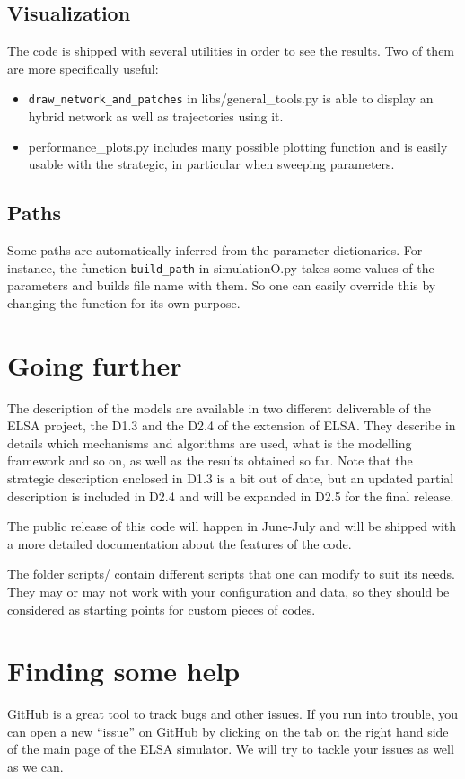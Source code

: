 \documentclass[12pt]{article}
\begin{document}
\subsection{Visualization}

The code is shipped with several utilities in order to see the results. Two of them are more specifically useful:
\begin{itemize}
\item \verb|draw_network_and_patches| in libs/general\_tools.py is able to display an hybrid network as well as trajectories using it.
\item performance\_plots.py includes many possible plotting function and is easily usable with the strategic, in particular when sweeping parameters. 
\end{itemize}

\subsection{Paths}
Some paths are automatically inferred from the parameter dictionaries. For instance, the function \verb|build_path| in simulationO.py takes some values of the parameters and builds file name with them. So one can easily override this by changing the function for its own purpose.


\section{Going further}

The description of the models are available in two different deliverable of the ELSA project, the D1.3 and the D2.4 of the extension of ELSA. They describe in details which mechanisms and algorithms are used, what is the modelling framework and so on, as well as the results obtained so far. Note that the strategic description enclosed in D1.3 is a bit out of date, but an updated partial description is included in D2.4 and will be expanded in D2.5 for the final release.

The public release of this code will happen in June-July and will be shipped with a more detailed documentation about the features of the code.

The folder scripts/ contain different scripts that one can modify to suit its needs. They may or may not work with your configuration and data, so they should be considered as starting points for custom pieces of codes.


\section*{Finding some help}
GitHub is a great tool to track bugs and other issues. If you run into trouble, you can open a new ``issue'' on GitHub by clicking on the tab on the right hand side of the main page of the ELSA simulator. We will try to tackle your issues as well as we can.
\end{document}
